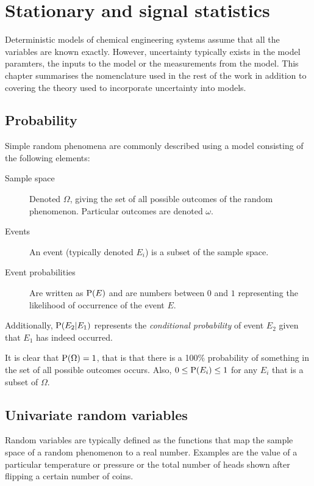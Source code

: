 \chapter{Stationary and signal statistics}\label{chap:stats}
\begin{overview} 
  Deterministic models of chemical engineering systems assume that all the variables are known exactly.
  However, uncertainty typically exists in the model paramters, the inputs to the model or the measurements from the model.
  This chapter summarises the nomenclature used in the rest of the work in addition to covering the theory used to incorporate uncertainty into models.
\end{overview}

\section{Probability}
Simple random phenomena are commonly described using a model consisting of the following elements:\citep[1]{kulkarni1999modeling}
\begin{description}
\item[Sample space] Denoted $\Omega$, giving the set of all possible outcomes of the random phenomenon.  
  Particular outcomes are denoted $\omega$.
\item[Events] An event (typically denoted $E_i$) is a subset of the sample space.
\item[Event probabilities] Are written as $\mathrm{P}(E)$ and are numbers between $0$ and $1$ representing the likelihood of occurrence of the event $E$.
\end{description}

Additionally, $\mathrm{P}(E_2|E_1)$  represents the \emph{conditional probability} of event $E_2$ given that $E_1$ has indeed occurred.

It is clear that $\mathrm{P}(\Omega)=1$, that is that there is a 100\% probability of something in the set of all possible outcomes occurs.
Also, $0 \leq \mathrm{P}(E_i) \leq 1$ for any $E_i$ that is a subset of $\Omega$.

\section{Univariate random variables}
\label{sec:univ-rand-vari}
Random variables are typically defined as the functions that map the sample space of a random phenomenon to a real number.
Examples are the value of a particular temperature or pressure or the total number of heads shown after flipping a certain number of coins.

